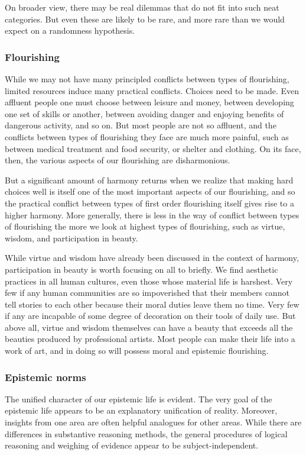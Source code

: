 On broader view, there may be real dilemmas that do not fit into such neat categories. But even these are likely to be 
rare, and more rare than we would expect on a randomness hypothesis.

\subsubsection{Flourishing}
While we may not have many principled conflicts between types of flourishing, limited resources induce many 
practical conflicts. Choices need to be made.
Even affluent people one must choose between leisure and money, between developing one set of skills or another, 
between avoiding danger and enjoying benefits of dangerous activity, and so on. But most people are not so affluent,
and the conflicts between types of flourishing they face are much more painful, such as between medical treatment and food security, or shelter and clothing. On its face, then, the various aspects of our flourishing are disharmonious. 

But a significant amount of harmony returns when we realize that making hard choices well is itself one of the most 
important aspects of our flourishing, and so the practical conflict between types of first order flourishing itself gives rise
to a higher harmony. More generally, there is less in the way of conflict between types of flourishing the more we look 
at highest types of flourishing, such as virtue, wisdom, and participation in beauty. 

While virtue and wisdom have already been discussed in the context of harmony, participation in beauty is worth focusing
on all to briefly. We find aesthetic practices in all human cultures, even those whose material life is harshest. Very 
few if any human communities are so impoverished that their members cannot tell stories to each other because their moral
duties leave them no time. Very few if any are incapable of some degree of decoration on their tools of daily use. But
above all, virtue and wisdom themselves can have a beauty that exceeds all the beauties produced by professional artists.
Most people can make their life into a work of art, and in doing so will possess moral and epistemic flourishing.

\subsubsection{Epistemic norms}
The unified character of our epistemic life is evident. The very goal of the epistemic life appears to be an explanatory unification of reality. Moreover, insights from one area are often helpful analogues for other areas. While there are differences in 
substantive reasoning methods, the general procedures of logical reasoning and weighing of evidence appear to be 
subject-independent.

